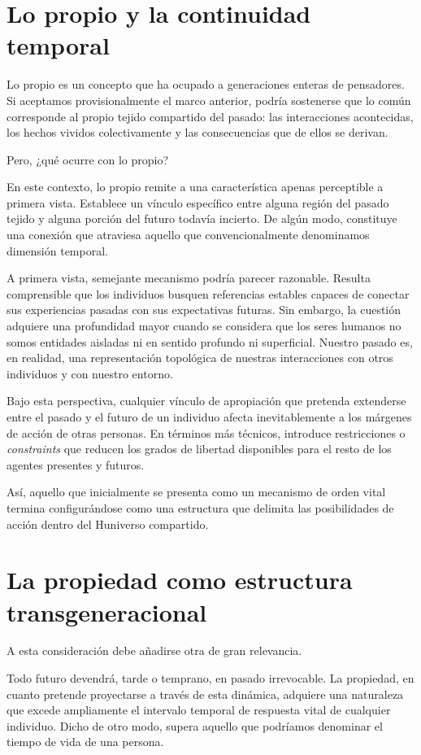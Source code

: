 \documentclass[12pt,a4paper]{article}
\begin{document}
\section*{Lo propio y la continuidad temporal}

Lo propio es un concepto que ha ocupado a generaciones enteras de pensadores. Si aceptamos provisionalmente el marco anterior, podría sostenerse que lo común corresponde al propio tejido compartido del pasado: las interacciones acontecidas, los hechos vividos colectivamente y las consecuencias que de ellos se derivan.

Pero, ¿qué ocurre con lo propio?

En este contexto, lo propio remite a una característica apenas perceptible a primera vista. Establece un vínculo específico entre alguna región del pasado tejido y alguna porción del futuro todavía incierto. De algún modo, constituye una conexión que atraviesa aquello que convencionalmente denominamos dimensión temporal.

A primera vista, semejante mecanismo podría parecer razonable. Resulta comprensible que los individuos busquen referencias estables capaces de conectar sus experiencias pasadas con sus expectativas futuras. Sin embargo, la cuestión adquiere una profundidad mayor cuando se considera que los seres humanos no somos entidades aisladas ni en sentido profundo ni superficial. Nuestro pasado es, en realidad, una representación topológica de nuestras interacciones con otros individuos y con nuestro entorno.

Bajo esta perspectiva, cualquier vínculo de apropiación que pretenda extenderse entre el pasado y el futuro de un individuo afecta inevitablemente a los márgenes de acción de otras personas. En términos más técnicos, introduce restricciones o \textit{constraints} que reducen los grados de libertad disponibles para el resto de los agentes presentes y futuros.

Así, aquello que inicialmente se presenta como un mecanismo de orden vital termina configurándose como una estructura que delimita las posibilidades de acción dentro del Huniverso compartido.

\section*{La propiedad como estructura transgeneracional}

A esta consideración debe añadirse otra de gran relevancia.

Todo futuro devendrá, tarde o temprano, en pasado irrevocable. La propiedad, en cuanto pretende proyectarse a través de esta dinámica, adquiere una naturaleza que excede ampliamente el intervalo temporal de respuesta vital de cualquier individuo. Dicho de otro modo, supera aquello que podríamos denominar el tiempo de vida de una persona.
\end{document}
